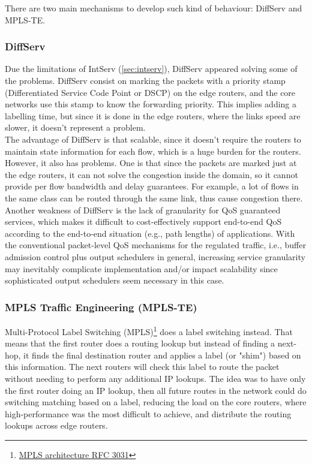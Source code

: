 There are two main mechanisms to develop such kind of behaviour: DiffServ and MPLS-TE.\\

\subsubsection{DiffServ\\}

Due the limitations of IntServ (\ref{sec:intserv}), DiffServ appeared solving some of the problems. DiffServ consist on marking the packets with a priority stamp (Differentiated Service Code Point or DSCP) on the edge routers, and the core networks use this stamp to know the forwarding priority. This implies adding a labelling time, but since it is done in the edge routers, where the links speed are slower, it doesn't represent a problem.\\

The advantage of DiffServ is that scalable, since it doesn't require the routers to maintain state information for each flow, which is a huge burden for the routers. However, it also has problems. One is that since the packets are marked just at the edge routers, it can not solve the congestion inside the domain, so it cannot provide per flow bandwidth and delay guarantees. For example, a lot of flows in the same class can be routed through the same link, thus cause congestion there.\\

Another weakness of DiffServ is the lack of granularity for QoS guaranteed services, which makes it difficult to cost-effectively support end-to-end QoS according to the end-to-end situation (e.g., path lengths) of applications. With the conventional packet-level QoS mechanisms for the regulated traffic, i.e., buffer admission control plus output schedulers in general, increasing service granularity may inevitably complicate implementation and/or impact scalability since sophisticated output schedulers seem necessary in this case.\\


\subsubsection{MPLS Traffic Engineering (MPLS-TE)\\}
\label{sec:mpls-te}

Multi-Protocol Label Switching (MPLS)\footnote{\href{http://www.ietf.org/rfc/rfc3031.txt}{MPLS architecture RFC 3031}} does a label switching instead. That means that the first router does a routing lookup but instead of finding a next-hop, it finds the final destination router and applies a label (or "shim") based on this information. The next routers will check this label to route the packet without needing to perform any additional IP lookups. The idea was to have only the first router doing an IP lookup, then all future routes in the network could do switching matching based on a label, reducing the load on the core routers, where high-performance was the most difficult to achieve, and distribute the routing lookups across edge routers.\\


